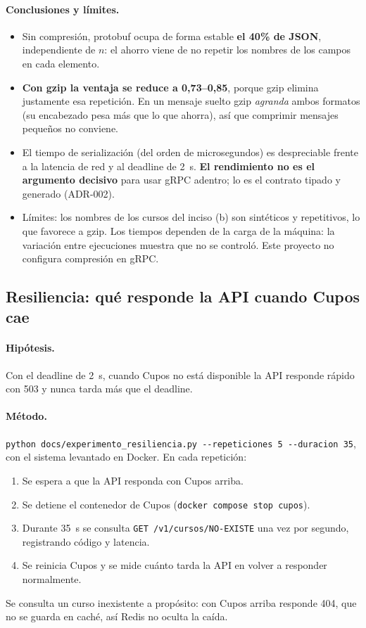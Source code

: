 \documentclass[11pt,spanish]{article}
\begin{document}
\paragraph{Conclusiones y límites.}
\begin{itemize}
    \item Sin compresión, protobuf ocupa de forma estable \textbf{el 40\% de JSON}, independiente de $n$: el ahorro viene de no repetir los nombres de los campos en cada elemento.
    \item \textbf{Con gzip la ventaja se reduce a 0,73--0,85}, porque gzip elimina justamente esa repetición. En un mensaje suelto gzip \emph{agranda} ambos formatos (su encabezado pesa más que lo que ahorra), así que comprimir mensajes pequeños no conviene.
    \item El tiempo de serialización (del orden de microsegundos) es despreciable frente a la latencia de red y al deadline de 2~s. \textbf{El rendimiento no es el argumento decisivo} para usar gRPC adentro; lo es el contrato tipado y generado (ADR-002).
    \item Límites: los nombres de los cursos del inciso (b) son sintéticos y repetitivos, lo que favorece a gzip. Los tiempos dependen de la carga de la máquina: la variación entre ejecuciones muestra que no se controló. Este proyecto no configura compresión en gRPC.
\end{itemize}

\subsection{Resiliencia: qué responde la API cuando Cupos cae}\label{sec:exp-resiliencia}

\paragraph{Hipótesis.} Con el deadline de 2~s, cuando Cupos no está disponible la API responde rápido con 503 y nunca tarda más que el deadline.

\paragraph{Método.} \texttt{python docs/experimento\_resiliencia.py -{}-repeticiones 5 -{}-duracion 35}, con el sistema levantado en Docker. En cada repetición:
\begin{enumerate}
    \item Se espera a que la API responda con Cupos arriba.
    \item Se detiene el contenedor de Cupos (\texttt{docker compose stop cupos}).
    \item Durante 35~s se consulta \texttt{GET /v1/cursos/NO-EXISTE} una vez por segundo, registrando código y latencia.
    \item Se reinicia Cupos y se mide cuánto tarda la API en volver a responder normalmente.
\end{enumerate}
Se consulta un curso inexistente a propósito: con Cupos arriba responde 404, que no se guarda en caché, así Redis no oculta la caída.
\end{document}
